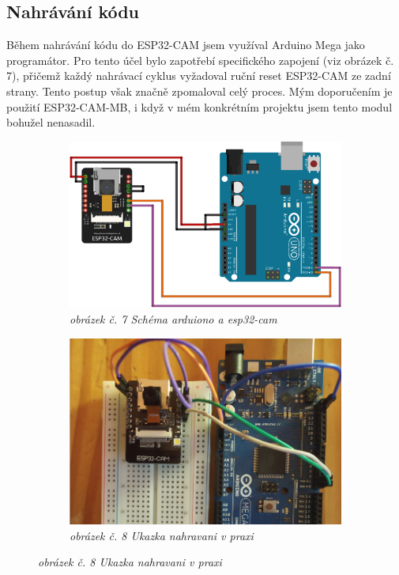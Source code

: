 \documentclass[12pt, a4paper,
oneside,      %
openany
]{report}
\begin{document}
\subsection{Nahrávání kódu}
\noindent Během nahrávání kódu do ESP32-CAM jsem využíval Arduino Mega jako programátor. Pro tento účel bylo zapotřebí specifického zapojení (viz obrázek č. 7), přičemž každý nahrávací cyklus vyžadoval ruční reset ESP32-CAM ze zadní strany. Tento postup však značně zpomaloval celý proces. Mým doporučením je použití ESP32-CAM-MB, i když v mém konkrétním projektu jsem tento modul bohužel nenasadil.
\begin{figure}[h]
    \begin{subfigure}{0.48\textwidth}
        \centering
		\includegraphics[width=\textwidth]{image/schemaNahrani.png}
        \caption*{\textit{obrázek č. 7 Schéma arduiono a esp32-cam}}
        \label{fig:schemaArduino}
    \end{subfigure}
    \begin{subfigure}{0.48\textwidth}
        \centering
        \includegraphics[width=\textwidth]{image/nahravaniVPraxi.png}
        \caption*{\textit{obrázek č. 8 Ukazka nahravani v praxi}}
        \label{fig:nahraniVPraxi}
    \end{subfigure}     
\end{figure}
\end{document}
